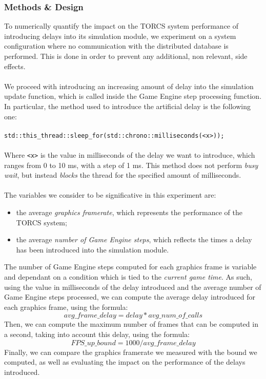 \subsubsection{Methods \& Design}\label{delay-design}
To numerically quantify the impact on the TORCS system performance of introducing delays into its simulation module, we experiment on a system configuration where no communication with the distributed database is performed. This is done in order to prevent any additional, non relevant, side effects. \\ \\
We proceed with introducing an increasing amount of delay into the simulation update function, which is called inside the Game Engine step processing function. In particular, the method used to introduce the artificial delay is the following one: \\ \\
\texttt{std::this\_thread::sleep\_for(std::chrono::milliseconds(<x>));}
\\ \\
Where \texttt{<x>} is the value in milliseconds of the delay we want to introduce, which ranges from 0 to 10 ms, with a step of 1 ms. This method does not perform \textit{busy wait}, but instead \textit{blocks} the thread for the specified amount of milliseconds. \\ \\
The variables we consider to be significative in this experiment are:
\begin{itemize}
	\item the average \textit{graphics framerate}, which represents the performance of the TORCS system;
	\item the average \textit{number of Game Engine steps}, which reflects the times a delay has been introduced into the simulation module. 
\end{itemize}
The number of Game Engine steps computed for each graphics frame is variable and dependant on a condition which is tied to the \textit{current game time}. As such, using the value in milliseconds of the delay introduced and the average number of Game Engine steps processed, we can compute the average delay introduced for each graphics frame, using the formula:
\[avg\_frame\_delay = delay * avg\_num\_of\_calls\]
Then, we can compute the maximum number of frames that can be computed in a second, taking into account this delay, using the formula:
\[FPS\_up\_bound = 1000 / avg\_frame\_delay\]
Finally, we can compare the graphics framerate we measured with the bound we computed, as well as evaluating the impact on the performance of the delays introduced.

